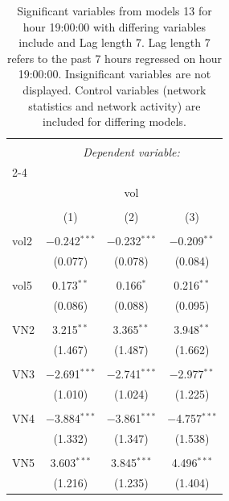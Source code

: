 
\begin{table}[!htbp] \centering 
  \caption{Significant variables from models 13 for hour 19:00:00 with differing variables include 
                               and Lag length 7. Lag length 7 refers to the past 7 hours regressed on hour 19:00:00. 
                               Insignificant variables are not displayed. 
                               Control variables (network statistics and network activity) are 
                               included for differing models.} 
  \label{Volumemodels2_t_hourlagged6} 
\scriptsize 
\begin{tabular}{@{\extracolsep{5pt}}lccc} 
\\[-1.8ex]\hline 
\hline \\[-1.8ex] 
 & \multicolumn{3}{c}{\textit{Dependent variable:}} \\ 
\cline{2-4} 
\\[-1.8ex] & \multicolumn{3}{c}{vol} \\ 
\\[-1.8ex] & (1) & (2) & (3)\\ 
\hline \\[-1.8ex] 
 vol2 & $-$0.242$^{***}$ & $-$0.232$^{***}$ & $-$0.209$^{**}$ \\ 
  & (0.077) & (0.078) & (0.084) \\ 
  & & & \\ 
 vol5 & 0.173$^{**}$ & 0.166$^{*}$ & 0.216$^{**}$ \\ 
  & (0.086) & (0.088) & (0.095) \\ 
  & & & \\ 
 VN2 & 3.215$^{**}$ & 3.365$^{**}$ & 3.948$^{**}$ \\ 
  & (1.467) & (1.487) & (1.662) \\ 
  & & & \\ 
 VN3 & $-$2.691$^{***}$ & $-$2.741$^{***}$ & $-$2.977$^{**}$ \\ 
  & (1.010) & (1.024) & (1.225) \\ 
  & & & \\ 
 VN4 & $-$3.884$^{***}$ & $-$3.861$^{***}$ & $-$4.757$^{***}$ \\ 
  & (1.332) & (1.347) & (1.538) \\ 
  & & & \\ 
 VN5 & 3.603$^{***}$ & 3.845$^{***}$ & 4.496$^{***}$ \\ 
  & (1.216) & (1.235) & (1.404) \\ 

\end{tabular}
\end{table}
